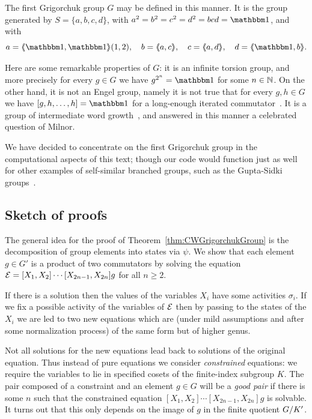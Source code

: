 \documentclass[a4paper,11pt]{amsart}
\begin{document}
The first Grigorchuk group $G$ may be defined in this manner. It is
the group generated by $S=\{a,b,c,d\}$, with $a^2=b^2=c^2=d^2=bcd=\id$,
and with
\[a=\pair{\id,\id}(1,2),\quad b=\pair{a,c},\quad c=\pair{a,d},\quad d=\pair{\id,b}. \]

Here are some remarkable properties of $G$: it is an infinite torsion
group, and more precisely for every $g\in G$ we have $g^{2^n}=\id$ for
some $n\in\mathbb{N}$. On the other hand, it is not an Engel group, namely it
is not true that for every $g,h\in G$ we have $[g,h,\dots,h]=\id$ for
a long-enough iterated commutator~\cite{Bartholdi:Engel}. It is a
group of intermediate word growth~\cite{Grigorchuk:Milnor}, and
answered in this manner a celebrated question of Milnor.

We have decided to concentrate on the first Grigorchuk group in the
computational aspects of this text; though our code would function
just as well for other examples of self-similar branched groups, such
as the Gupta-Sidki groups~\cite{Gupta-Sidki:PGroups}.


\subsection{Sketch of proofs}
The general idea for the proof of Theorem~\ref{thm:CWGrigorchukGroup}
is the decomposition of group elements into states via $\psi$. We show
that each element $g\in G'$ is a product of two commutators by solving
the equation $\mathcal{E}=[X_1,X_2]\cdots[X_{2n-1},X_{2n}]g$ for all
$n\geq 2$.

If there is a solution then the values of the variables $X_i$ have
some activities $\sigma_i$. If we fix a possible activity of the
variables of $\mathcal{E}$ then by passing to the states of the $X_i$ we are
led to two new equations which are (under mild assumptions and after
some normalization process) of the same form but of higher genus.

Not all solutions for the new equations lead back to solutions of the
original equation. Thus instead of pure equations we consider
\emph{constrained} equations: we require the variables to lie in
specified cosets of the finite-index subgroup $K$. The pair composed
of a constraint and an element $g\in G$ will be a \emph{good pair} if
there is some $n$ such that the constrained equation
$[X_1,X_2]\cdots[X_{2n-1},X_{2n}]g$ is solvable.  It turns out that
this only depends on the image of $g$ in the finite quotient
${G/K'}$.
\end{document}
